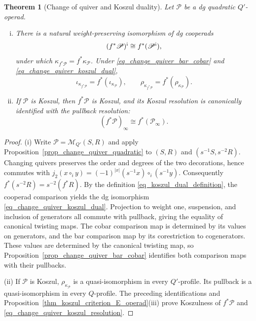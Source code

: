 \documentclass[11pt,letterpaper]{article}
\numberwithin{equation}{section}
\theoremstyle{plain}
\newtheorem{thm}{Theorem}[section]
\theoremstyle{definition}
\theoremstyle{remark}
\newcommand{\antishriek}{%
	\mathord{\mathchoice
		{\rotatebox[origin=c]{180}{$\displaystyle !$}}
		{\rotatebox[origin=c]{180}{$\textstyle !$}}
		{\rotatebox[origin=c]{180}{$\scriptstyle !$}}
		{\rotatebox[origin=c]{180}{$\scriptscriptstyle !$}}}}
\begin{document}
\begin{thm}[Change of quiver and Koszul duality]
\label{thm_change_quiver_koszul}
Let $\mathscr P$ be a dg quadratic $Q'$-operad.
\begin{enumerate}[(i)]
\item There is a natural weight-preserving isomorphism of dg cooperads
\begin{equation}\label{eq_change_quiver_koszul_dual}
 (f^*\mathscr P)^{\antishriek}
 \cong f^*(\mathscr P^{\antishriek}),
\end{equation}
under which $\kappa_{f^*\mathscr P}=f^*\kappa_{\mathscr P}$.
Under \eqref{eq_change_quiver_bar_cobar} and
\eqref{eq_change_quiver_koszul_dual},
\[
 \iota_{\kappa_{f^*\mathscr P}}
 =f^*(\iota_{\kappa_{\mathscr P}}),
 \qquad
 \rho_{\kappa_{f^*\mathscr P}}
 =f^*(\rho_{\kappa_{\mathscr P}}).
\]
\item If $\mathscr P$ is Koszul, then $f^*\mathscr P$ is Koszul,
and its Koszul resolution is canonically identified with the
pullback resolution:
\begin{equation}\label{eq_change_quiver_koszul_resolution}
 (f^*\mathscr P)_\infty\cong f^*(\mathscr P_\infty).
\end{equation}
\end{enumerate}
\end{thm}
\begin{proof}
(i) Write $\mathscr P=\mathscr M_{Q'}(S,R)$ and apply
Proposition~\ref{prop_change_quiver_quadratic} to $(S,R)$ and
$(s^{-1}S,s^{-2}R)$.
Changing quivers preserves the order and degrees of the two
decorations, hence commutes with
$j_2(x\circ_i y)=(-1)^{|x|}(s^{-1}x)\circ_i(s^{-1}y)$.
Consequently $f^*(s^{-2}R)=s^{-2}(f^*R)$. By the definition
\eqref{eq_koszul_dual_definition}, the cooperad comparison yields
the dg isomorphism \eqref{eq_change_quiver_koszul_dual}.
Projection to weight one, suspension, and inclusion
of generators all commute with pullback, giving the equality of
canonical twisting maps.
The cobar comparison map is determined by its values on generators,
and the bar comparison map by its corestriction to cogenerators.
These values are determined by the canonical twisting map, so
Proposition~\ref{prop_change_quiver_bar_cobar} identifies both
comparison maps with their pullbacks.

(ii) If $\mathscr P$ is Koszul, $\rho_{\kappa_{\mathscr P}}$ is a
quasi-isomorphism
in every $Q'$-profile. Its pullback is a quasi-isomorphism in every
$Q$-profile. The preceding identifications and
Proposition~\ref{thm_koszul_criterion_E_operad}(iii) prove Koszulness
of $f^*\mathscr P$ and \eqref{eq_change_quiver_koszul_resolution}.
\end{proof}
\end{document}

